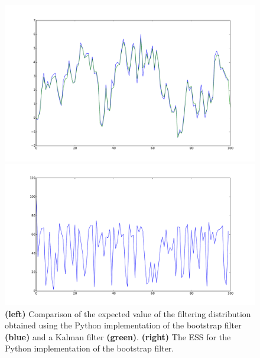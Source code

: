 \documentclass{article}
\begin{document}
\begin{figure}[htb]
	\centering
	\begin{minipage}{.45\textwidth}
		\centering
		\includegraphics[width=0.97\linewidth]{bootstrap-filter/verif_filter.pdf}
	\end{minipage}
	\begin{minipage}{.45\textwidth}
		\centering
		\includegraphics[width=0.97\linewidth]{bootstrap-filter/ESS_filter.pdf}
	\end{minipage}
	\caption{\textbf{(left)} Comparison of the expected value of the filtering distribution obtained using the Python implementation of the bootstrap filter \textbf{(blue)} and a Kalman filter \textbf{(green)}. \textbf{(right)} The ESS for the Python implementation of the bootstrap filter. }
	\label{fig:bootstrap}
\end{figure}
\end{document}
